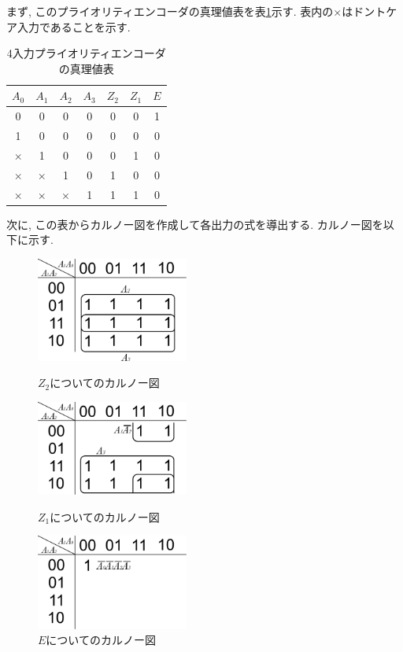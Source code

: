\documentclass[titlepage]{jsarticle}
\begin{document}
    まず, このプライオリティエンコーダの真理値表を表\ref{tab:priority_encoder}示す.
    表内の$\times$はドントケア入力であることを示す.
    \begin{table}[h]
      \caption{4入力プライオリティエンコーダの真理値表}
      \label{tab:priority_encoder}
      \centering
      \begin{tabular}{cccc||ccc}
        \hline
        $A_0$ & $A_1$ & $A_2$ & $A_3$ & $Z_2$ & $Z_1$ & $E$ \\ \hline \hline
        0 & 0 & 0 & 0 & 0 & 0 & 1 \\
        1 & 0 & 0 & 0 & 0 & 0 & 0 \\
        $\times$ & 1 & 0 & 0 & 0 & 1 & 0 \\
        $\times$ & $\times$ & 1 & 0 & 1 & 0 & 0 \\
        $\times$ & $\times$ & $\times$ & 1 & 1 & 1 & 0 \\ \hline
      \end{tabular}
    \end{table}

    次に, この表からカルノー図を作成して各出力の式を導出する.
    カルノー図を以下に示す.
    \begin{figure}[h]
      \begin{minipage}{0.33\hsize}
        \centering
        \includegraphics[width=5cm]{images/Z2Karnaugh.pdf}
        \caption{$Z_2$についてのカルノー図}
      \end{minipage}
      \begin{minipage}{0.33\hsize}
        \centering
        \includegraphics[width=5cm]{images/Z1karnaugh.pdf}
        \caption{$Z_1$についてのカルノー図}
      \end{minipage}
      \begin{minipage}{0.33\hsize}
        \centering
        \includegraphics[width=5cm]{images/Ekarnaugh.pdf}
        \caption{$E$についてのカルノー図}
      \end{minipage}
    \end{figure}
\end{document}

